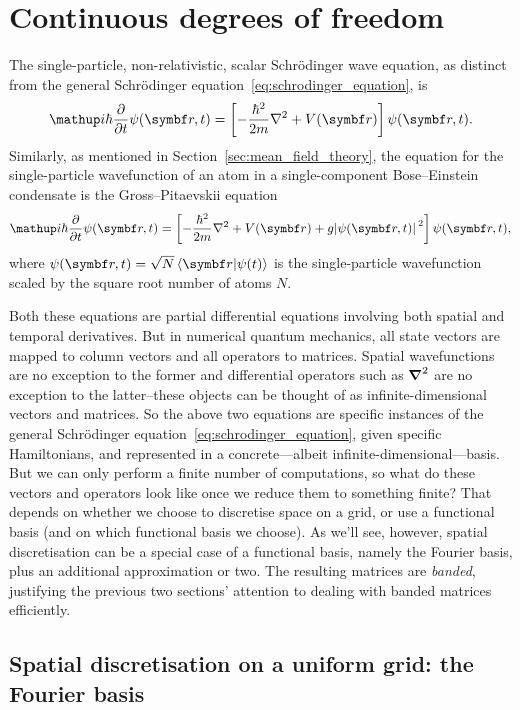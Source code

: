 \section{Continuous degrees of freedom}\label{sec:continuous_dof}
The single-particle, non-relativistic, scalar Schr\"odinger wave equation, as distinct from the general Schr\"odinger equation~\eqref{eq:schrodinger_equation}, is
\begin{align}\label{eq:schrodinger_wave_equation}
\ii\hbar\pdv{}{t}\psi(\vec r, t) = \left[-\frac{\hbar^2}{2m} \nabla^2 + V(\vec r)\right]\psi(\vec r, t).
\end{align}
Similarly, as mentioned in Section~\ref{sec:mean_field_theory}, the equation for the single-particle wavefunction of an atom in a single-component Bose--Einstein condensate is the Gross--Pitaevskii equation
\begin{align}
\ii\hbar\pdv{}{t}\psi(\vec r, t) = \left[-\frac{\hbar^2}{2m} \nabla^2 + V(\vec r) + g\abs{\psi(\vec r, t)}^2\right]\psi(\vec r, t),
\end{align}
where $\psi(\vec r, t) = \sqrt{N}\braket{\vec r}{\psi(t)}$ is the single-particle wavefunction scaled by the square root number of atoms $N$.

Both these equations are partial differential equations involving both spatial and temporal derivatives. But in numerical quantum mechanics, all state vectors are mapped to column vectors and all operators to matrices. Spatial wavefunctions are no exception to the former and differential operators such as $\grad^2$ are no exception to the latter--these objects can be thought of as infinite-dimensional vectors and matrices. So the above two equations are specific instances of the general Schr\"odinger equation~\eqref{eq:schrodinger_equation}, given specific Hamiltonians, and represented in a concrete---albeit infinite-dimensional---basis. But we can only perform a finite number of computations, so what do these vectors and operators look like once we reduce them to something finite? That depends on whether we choose to discretise space on a grid, or use a functional basis (and on which functional basis we choose). As we'll see, however, spatial discretisation can be a special case of a functional basis, namely the Fourier basis, plus an additional approximation or two. The resulting matrices are \emph{banded}, justifying the previous two sections' attention to dealing with banded matrices efficiently.

\subsection{Spatial discretisation on a uniform grid: the Fourier basis}

